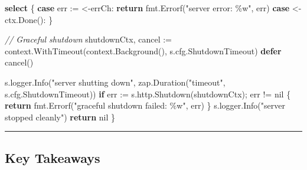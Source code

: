 \documentclass[
]{article}
\newenvironment{Shaded}{}{}
\newcommand{\CommentTok}[1]{\textcolor[rgb]{0.38,0.63,0.69}{\textit{#1}}}
\newcommand{\ControlFlowTok}[1]{\textcolor[rgb]{0.00,0.44,0.13}{\textbf{#1}}}
\newcommand{\NormalTok}[1]{#1}
\newcommand{\OperatorTok}[1]{\textcolor[rgb]{0.40,0.40,0.40}{#1}}
\newcommand{\OtherTok}[1]{\textcolor[rgb]{0.00,0.44,0.13}{#1}}
\newcommand{\StringTok}[1]{\textcolor[rgb]{0.25,0.44,0.63}{#1}}
\begin{document}
\begin{Shaded}
\begin{Highlighting}[]
    \ControlFlowTok{select} \OperatorTok{\{}
    \ControlFlowTok{case}\NormalTok{ err }\OperatorTok{:=} \OperatorTok{\textless{}{-}}\NormalTok{errCh}\OperatorTok{:}
        \ControlFlowTok{return}\NormalTok{ fmt}\OperatorTok{.}\NormalTok{Errorf}\OperatorTok{(}\StringTok{"server error: \%w"}\OperatorTok{,}\NormalTok{ err}\OperatorTok{)}
    \ControlFlowTok{case} \OperatorTok{\textless{}{-}}\NormalTok{ctx}\OperatorTok{.}\NormalTok{Done}\OperatorTok{():}
    \OperatorTok{\}}

    \CommentTok{// Graceful shutdown}
\NormalTok{    shutdownCtx}\OperatorTok{,}\NormalTok{ cancel }\OperatorTok{:=}\NormalTok{ context}\OperatorTok{.}\NormalTok{WithTimeout}\OperatorTok{(}\NormalTok{context}\OperatorTok{.}\NormalTok{Background}\OperatorTok{(),}\NormalTok{ s}\OperatorTok{.}\NormalTok{cfg}\OperatorTok{.}\NormalTok{ShutdownTimeout}\OperatorTok{)}
    \ControlFlowTok{defer}\NormalTok{ cancel}\OperatorTok{()}

\NormalTok{    s}\OperatorTok{.}\NormalTok{logger}\OperatorTok{.}\NormalTok{Info}\OperatorTok{(}\StringTok{"server shutting down"}\OperatorTok{,}\NormalTok{ zap}\OperatorTok{.}\NormalTok{Duration}\OperatorTok{(}\StringTok{"timeout"}\OperatorTok{,}\NormalTok{ s}\OperatorTok{.}\NormalTok{cfg}\OperatorTok{.}\NormalTok{ShutdownTimeout}\OperatorTok{))}
    \ControlFlowTok{if}\NormalTok{ err }\OperatorTok{:=}\NormalTok{ s}\OperatorTok{.}\NormalTok{http}\OperatorTok{.}\NormalTok{Shutdown}\OperatorTok{(}\NormalTok{shutdownCtx}\OperatorTok{);}\NormalTok{ err }\OperatorTok{!=} \OtherTok{nil} \OperatorTok{\{}
        \ControlFlowTok{return}\NormalTok{ fmt}\OperatorTok{.}\NormalTok{Errorf}\OperatorTok{(}\StringTok{"graceful shutdown failed: \%w"}\OperatorTok{,}\NormalTok{ err}\OperatorTok{)}
    \OperatorTok{\}}
\NormalTok{    s}\OperatorTok{.}\NormalTok{logger}\OperatorTok{.}\NormalTok{Info}\OperatorTok{(}\StringTok{"server stopped cleanly"}\OperatorTok{)}
    \ControlFlowTok{return} \OtherTok{nil}
\OperatorTok{\}}
\end{Highlighting}
\end{Shaded}

\begin{center}\rule{0.5\linewidth}{0.5pt}\end{center}

\hypertarget{key-takeaways}{%
\subsection{Key Takeaways}\label{key-takeaways}}
\end{document}
